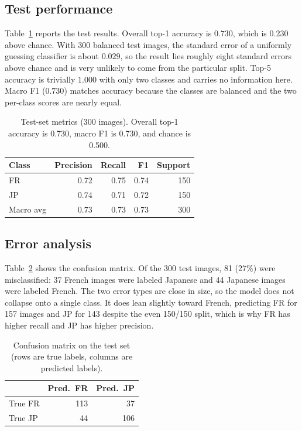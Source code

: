 \documentclass[conference]{IEEEtran}
\begin{document}
\subsection{Test performance}

Table~\ref{tab:test} reports the test results. Overall top-1 accuracy is
$0.730$, which is $0.230$ above chance. With 300 balanced test images, the
standard error of a uniformly guessing classifier is about $0.029$, so the
result lies roughly eight standard errors above chance and is very unlikely
to come from the particular split. Top-5 accuracy is trivially $1.000$ with
only two classes and carries no information here. Macro F1 ($0.730$) matches
accuracy because the classes are balanced and the two per-class scores are
nearly equal.

\begin{table}[htbp]
\caption{Test-set metrics (300 images). Overall top-1 accuracy is 0.730,
macro F1 is 0.730, and chance is 0.500.}
\label{tab:test}
\centering
\begin{tabular}{@{}lrrrr@{}}
\toprule
Class & Precision & Recall & F1 & Support \\
\midrule
FR & 0.72 & 0.75 & 0.74 & 150 \\
JP & 0.74 & 0.71 & 0.72 & 150 \\
\midrule
Macro avg & 0.73 & 0.73 & 0.73 & 300 \\
\bottomrule
\end{tabular}
\end{table}

\subsection{Error analysis}

Table~\ref{tab:confusion} shows the confusion matrix. Of the 300 test
images, 81 (27\%) were misclassified: 37 French images were labeled Japanese
and 44 Japanese images were labeled French. The two error types are close
in size, so the model does not collapse onto a single class. It does lean
slightly toward French, predicting FR for 157 images and JP for 143 despite
the even 150/150 split, which is why FR has higher recall and JP has higher
precision.

\begin{table}[htbp]
\caption{Confusion matrix on the test set (rows are true labels, columns are
predicted labels).}
\label{tab:confusion}
\centering
\begin{tabular}{@{}lrr@{}}
\toprule
 & Pred.\ FR & Pred.\ JP \\
\midrule
True FR & 113 & 37 \\
True JP & 44 & 106 \\
\bottomrule
\end{tabular}
\end{table}
\end{document}
